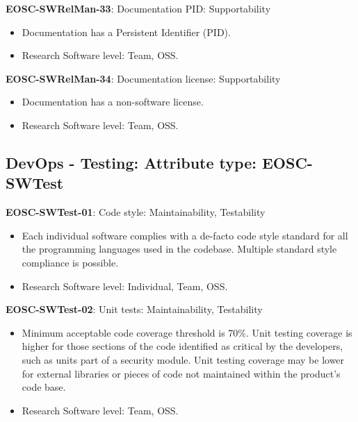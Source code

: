 \textbf{EOSC-SWRelMan-33}: Documentation PID: Supportability

\begin{itemize}
    \item Documentation has a Persistent Identifier (PID). \cite{orviz_fernandez_eosc-synergy_2020}
    \item Research Software level: Team, OSS.
\end{itemize}

\textbf{EOSC-SWRelMan-34}: Documentation license: Supportability

\begin{itemize}
    \item Documentation has a non-software license. \cite{orviz_fernandez_eosc-synergy_2020}
    \item Research Software level: Team, OSS.
\end{itemize}

\subsection{DevOps - Testing: Attribute type: EOSC-SWTest}

\textbf{EOSC-SWTest-01}: Code style: Maintainability, Testability

\begin{itemize}
    \item Each individual software complies with a de-facto code style standard for all the programming languages used in the codebase. Multiple standard style compliance is possible. \cite{orviz_set_2017,raymond_software_2013}
    \item Research Software level: Individual, Team, OSS.
\end{itemize}

\textbf{EOSC-SWTest-02}: Unit tests: Maintainability, Testability

\begin{itemize}
    \item Minimum acceptable code coverage threshold is 70\%. Unit testing coverage is higher for those sections of the code identified as critical by the developers, such as units part of a security module. Unit testing coverage may be lower for external libraries or pieces of code not maintained within the product's code base. \cite{aberdour_achieving_2007,nagappan_early_2005,boehm_quantitative_1976,shepherdson_cessda_2019,orviz_set_2017,raymond_software_2013}
    \item Research Software level: Team, OSS.
\end{itemize}

